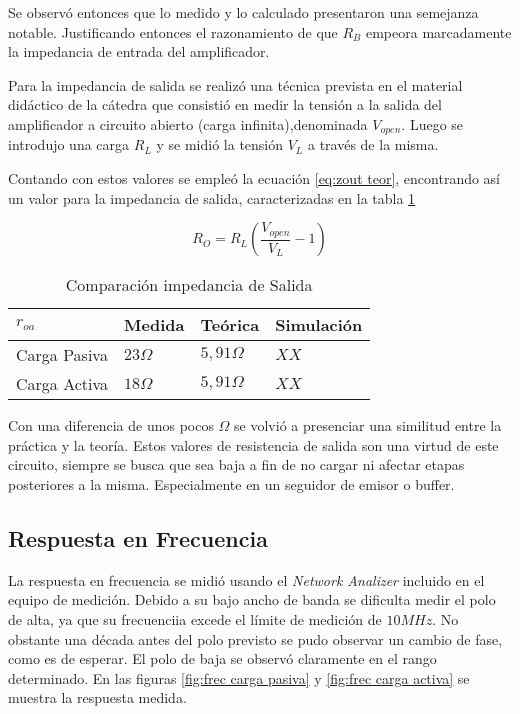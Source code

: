 Se observó entonces que lo medido y lo calculado presentaron una semejanza notable. Justificando entonces el razonamiento de que $R_B$ empeora marcadamente la impedancia de entrada del amplificador.

Para la impedancia de salida se realizó una técnica prevista en el material didáctico de la cátedra que consistió en medir la tensión a la salida del amplificador a circuito abierto (carga infinita),denominada $V_{open}$. Luego se introdujo una carga $R_L$ y se midió la tensión $V_L$ a través de la misma.

Contando con estos valores se empleó la ecuación \eqref{eq:zout teor}, encontrando así un valor para la impedancia de salida, caracterizadas en la tabla \ref{table:Ro comp}

\begin{equation}
    R_O = R_L(\frac{V_{open}}{V_L}-1)
    \label{eq:zout teor}
\end{equation}

\begin{table}[ht]
    \centering
    \begin{tabular}{|l|l|l|l|}
    \hline
    $r_{oa}$     & Medida     & Teórica         & Simulación \\ \hline
    Carga Pasiva & $23\Omega$ & $5,91\Omega $   &  $XX $          \\ \hline
    Carga Activa & $18\Omega$ &  $5,91\Omega $  &  $XX $          \\ \hline
    \end{tabular}
    \caption{Comparación impedancia de Salida}\label{table:Ro comp}
\end{table}

Con una diferencia de unos pocos $\Omega$ se volvió a presenciar una similitud entre la práctica y la teoría. Estos valores de resistencia de salida son una virtud de este circuito, siempre se busca que sea baja a fin de no cargar ni afectar etapas posteriores a la misma. Especialmente en un seguidor de emisor o buffer.

\subsection{Respuesta en Frecuencia}

La respuesta en frecuencia se midió usando el \textit{Network Analizer} incluido en el equipo de medición. Debido a su bajo ancho de banda se dificulta medir el polo de alta, ya que su frecuenciia excede el límite de medición de $10 MHz$. No obstante una década antes del polo previsto se pudo observar un cambio de fase, como es de esperar.
El polo de baja se observó claramente en el rango determinado. En las figuras \ref{fig:frec carga pasiva} y \ref{fig:frec carga activa} se muestra la respuesta medida.

